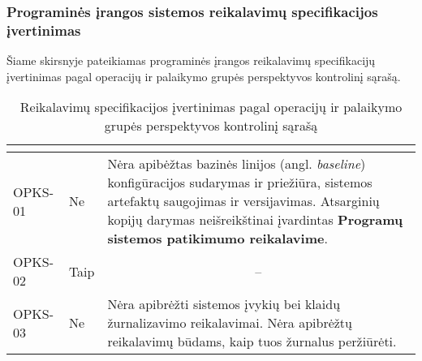 \documentclass{VUMIFPSkursinis}
\begin{document}
\subsubsection{Programinės įrangos sistemos reikalavimų specifikacijos įvertinimas}

Šiame skirsnyje pateikiamas programinės įrangos reikalavimų specifikacijų įvertinimas pagal operacijų ir palaikymo grupės perspektyvos kontrolinį sąrašą.
\begin{center}

	\begin{longtable}{|C{2cm}|L{2.5cm}|L{10cm}|}

		\caption{Reikalavimų specifikacijos įvertinimas pagal operacijų ir palaikymo grupės perspektyvos kontrolinį sąrašą}
		\label{table:VKS}

		\\ \hline
		 &
		 &
		\\ \hline
		OPKS-01                                         &
		Ne                                              &
		Nėra apibėžtas bazinės linijos (angl. \textit{baseline}) konfigūracijos sudarymas ir priežiūra, sistemos artefaktų saugojimas ir versijavimas. Atsarginių kopijų darymas neišreikštinai įvardintas \textbf{Programų sistemos patikimumo reikalavime}.             \\ \hline
		OPKS-02                                         &
		Taip                                            &
		                                                                                                                                                                                                                                           \\ \hline
		OPKS-03                                         &
		Ne                                              &
		Nėra apibrėžti sistemos įvykių bei klaidų žurnalizavimo reikalavimai. Nėra apibrėžtų reikalavimų būdams, kaip tuos žurnalus peržiūrėti.                                                                                                                            \\ \hline

\end{longtable}
\end{center}
\end{document}
